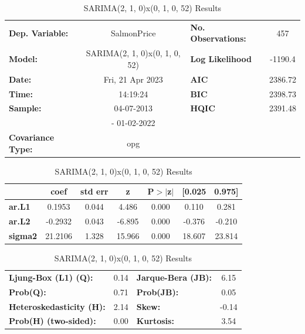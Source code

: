 \begin{table}
    \begin{center}
        \begin{tabular}{lclc}
        \toprule
        \textbf{Dep. Variable:}          &          SalmonPrice           & \textbf{  No. Observations:  } &    457      \\
        \textbf{Model:}                  & SARIMA(2, 1, 0)x(0, 1, 0, 52) & \textbf{  Log Likelihood     } & -1190.4   \\
        \textbf{Date:}                   &        Fri, 21 Apr 2023        & \textbf{  AIC                } &  2386.72   \\
        \textbf{Time:}                   &            14:19:24            & \textbf{  BIC                } &  2398.73   \\
        \textbf{Sample:}                 &           04-07-2013           & \textbf{  HQIC               } &  2391.48   \\
        \textbf{}                        &          - 01-02-2022          & \textbf{                     } &             \\
        \textbf{Covariance Type:}        &              opg               & \textbf{                     } &             \\
        \bottomrule
        \end{tabular}
        \begin{tabular}{lcccccc}
                        & \textbf{coef} & \textbf{std err} & \textbf{z} & \textbf{P$> |$z$|$} & \textbf{[0.025} & \textbf{0.975]}  \\
        \midrule
        \textbf{ar.L1}  &       0.1953  &        0.044     &     4.486  &         0.000        &        0.110    &        0.281     \\
        \textbf{ar.L2}  &      -0.2932  &        0.043     &    -6.895  &         0.000        &       -0.376    &       -0.210     \\
        \textbf{sigma2} &      21.2106  &        1.328     &    15.966  &         0.000        &       18.607    &       23.814     \\
        \bottomrule
        \end{tabular}
        \begin{tabular}{lclc}
        \textbf{Ljung-Box (L1) (Q):}     & 0.14 & \textbf{  Jarque-Bera (JB):  } &  6.15  \\
        \textbf{Prob(Q):}                & 0.71 & \textbf{  Prob(JB):          } &  0.05  \\
        \textbf{Heteroskedasticity (H):} & 2.14 & \textbf{  Skew:              } & -0.14  \\
        \textbf{Prob(H) (two-sided):}    & 0.00 & \textbf{  Kurtosis:          } &  3.54  \\
        \bottomrule
        \end{tabular}
        \caption{SARIMA(2, 1, 0)x(0, 1, 0, 52) Results}\label{tab:SARIMA_summary}
    \end{center}
\end{table}
